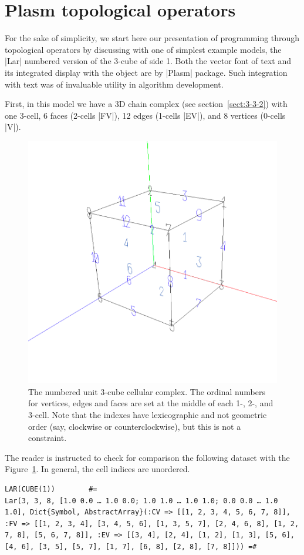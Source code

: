 \section{ Plasm topological operators}\label{sect:5-2}

For the sake of simplicity, we start here our presentation of programming through  topological operators by discussing with one of simplest example models, the |Lar| numbered version of the 3-cube of side 1. Both the vector font of text and its integrated display with the object are by |Plasm| package.  Such integration with text was of invaluable utility in algorithm development.

First, in this model we have a 3D chain complex (see section~\ref{sect:3-3-2}) with 
one 3-cell, 6 faces (2-cells |FV|), 12 edges (1-cells |EV|), and 8 vertices (0-cells |V|).

\begin{figure}[htbp] %
   \sidecaption[t]
   \includegraphics[width=0.5\linewidth]{chapter-05/figs/cube} 
   \caption{The numbered unit 3-cube cellular complex. 
   The ordinal numbers  for vertices, edges and faces are set at the middle of each 1-, 2-, and 3-cell. Note that the indexes have lexicographic and not geometric order (say, clockwise or counterclockwise), but this is not a constraint. }
   \label{fig:5:1:cube}
\end{figure}
The reader is instructed to check for comparison the following dataset with the Figure~\ref{fig:5:1:cube}. In general, the cell indices are unordered.
\begin{lstlisting}[language=JuliaLocal, style=julia, mathescape=true]
LAR(CUBE(1))		#=
Lar(3, 3, 8, [1.0 0.0 … 1.0 0.0; 1.0 1.0 … 1.0 1.0; 0.0 0.0 … 1.0 1.0], Dict{Symbol, AbstractArray}(:CV => [[1, 2, 3, 4, 5, 6, 7, 8]], :FV => [[1, 2, 3, 4], [3, 4, 5, 6], [1, 3, 5, 7], [2, 4, 6, 8], [1, 2, 7, 8], [5, 6, 7, 8]], :EV => [[3, 4], [2, 4], [1, 2], [1, 3], [5, 6], [4, 6], [3, 5], [5, 7], [1, 7], [6, 8], [2, 8], [7, 8]])) =#
\end{lstlisting}


